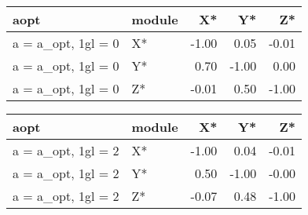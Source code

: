 \documentclass[10pt,a4paper]{article}
\begin{document}
\begin{table}[ht]
\centering
\begin{tabular}{llrrr}
  \hline
aopt & module & X* & Y* & Z* \\ 
  \hline
a = a\_opt, 1gl = 0 & X* & -1.00 & 0.05 & -0.01 \\ 
  a = a\_opt, 1gl = 0 & Y* & 0.70 & -1.00 & 0.00 \\ 
  a = a\_opt, 1gl = 0 & Z* & -0.01 & 0.50 & -1.00 \\ 
   \hline
\end{tabular}
\end{table}


\begin{table}[ht]
\centering
\begin{tabular}{llrrr}
  \hline
aopt & module & X* & Y* & Z* \\ 
  \hline
a = a\_opt, 1gl = 2 & X* & -1.00 & 0.04 & -0.01 \\ 
  a = a\_opt, 1gl = 2 & Y* & 0.50 & -1.00 & -0.00 \\ 
  a = a\_opt, 1gl = 2 & Z* & -0.07 & 0.48 & -1.00 \\ 
   \hline
\end{tabular}
\end{table}
 
\end{document}
